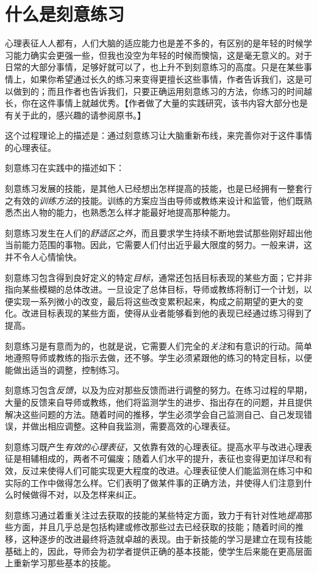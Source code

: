 \documentclass[12pt,oneside]{book}
\begin{document}
\section{什么是刻意练习}
心理表征人人都有，人们大脑的适应能力也是差不多的，有区别的是年轻的时候学习能力确实会更强一些，但我也没空为年轻的时候而懊恼，这是毫无意义的。对于日常的大部分事情，足够好就可以了，也上升不到刻意练习的高度。只是在某些事情上，如果你希望通过长久的练习来变得更擅长这些事情，作者告诉我们，这是可以做到的；而且作者也告诉我们，只要正确运用刻意练习的方法，你练习的时间越长，你在这件事情上就越优秀。【作者做了大量的实践研究，该书内容大部分也是有关于此的，感兴趣的请参阅原书。】

这个过程理论上的描述是：通过刻意练习让大脑重新布线，来完善你对于这件事情的心理表征。

刻意练习在实践中的描述如下：

\begin{bookref}[frametitle={\cite{刻意练习}}]
刻意练习发展的技能，是其他人已经想出怎样提高的技能，也是已经拥有一整套行之有效的\emph{训练方法}的技能。训练的方案应当由导师或教练来设计和监管，他们既熟悉杰出人物的能力，也熟悉怎么样才能最好地提高那种能力。

刻意练习发生在人们的\emph{舒适区之外}，而且要求学生持续不断地尝试那些刚好超出他当前能力范围的事物。因此，它需要人们付出近乎最大限度的努力。一般来讲，这并不令人心情愉快。

刻意练习包含得到良好定义的特定\emph{目标}，通常还包括目标表现的某些方面；它并非指向某些模糊的总体改进。一旦设定了总体目标，导师或教练将制订一个计划，以便实现一系列微小的改变，最后将这些改变累积起来，构成之前期望的更大的变化。改进目标表现的某些方面，使得从业者能够看到他的表现已经通过练习得到了提高。

刻意练习是有意而为的，也就是说，它需要人们完全的\emph{关注}和有意识的行动。简单地遵照导师或教练的指示去做，还不够。学生必须紧跟他的练习的特定目标，以便能做出适当的调整，控制练习。

刻意练习包含\emph{反馈}，以及为应对那些反馈而进行调整的努力。在练习过程的早期，大量的反馈来自导师或教练，他们将监测学生的进步、指出存在的问题，并且提供解决这些问题的方法。随着时间的推移，学生必须学会自己监测自己、自己发现错误，并做出相应调整。这种自我监测，需要高效的心理表征。

刻意练习既产生\emph{有效的心理表征}，又依靠有效的心理表征。提高水平与改进心理表征是相辅相成的，两者不可偏废；随着人们水平的提升，表征也变得更加详尽和有效，反过来使得人们可能实现更大程度的改进。心理表征使人们能监测在练习中和实际的工作中做得怎么样。它们表明了做某件事的正确方法，并使得人们注意到什么时候做得不对，以及怎样来纠正。

刻意练习通过着重关注过去获取的技能的某些特定方面，致力于有针对性地\emph{提高}那些方面，并且几乎总是包括构建或修改那些过去已经获取的技能；随着时间的推移，这种逐步的改进最终将造就卓越的表现。由于新技能的学习是建立在现有技能基础上的，因此，导师会为初学者提供正确的基本技能，使学生后来能在更高层面上重新学习那些基本的技能。
\end{bookref}
\end{document}
